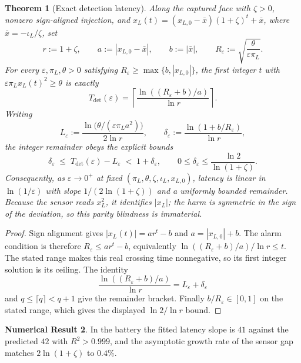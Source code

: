 \documentclass[11pt]{article}
\newtheorem{theorem}{Theorem}[section]
\theoremstyle{definition}
\newtheorem{numresult}[theorem]{Numerical Result}
\theoremstyle{remark}
\numberwithin{equation}{section}
\begin{document}
\begin{theorem}[Exact detection latency]\label{prop:latency}
Along the captured face with $\zeta>0$, nonzero sign-aligned injection, and
$x_L(t)=(x_{L,0}-\bar x)(1+\zeta)^t+\bar x$, where
$\bar x=-\iota_L/\zeta$, set
\[
r:=1+\zeta,\qquad
a:=|x_{L,0}-\bar x|,\qquad b:=|\bar x|,\qquad
R_\varepsilon:=\sqrt{\frac{\theta}{\varepsilon\pi_L}}.
\]
For every $\varepsilon,\pi_L,\theta>0$ satisfying
$R_\varepsilon\ge\max\{b,|x_{L,0}|\}$, the first integer $t$ with
$\varepsilon\pi_Lx_L(t)^2\ge\theta$ is exactly
\[
T_{\det}(\varepsilon)
=
\left\lceil
\frac{\ln((R_\varepsilon+b)/a)}{\ln r}
\right\rceil.
\]
Writing
\[
L_\varepsilon
:=
\frac{\ln\bigl(\theta/(\varepsilon\pi_La^2)\bigr)}{2\ln r},
\qquad
\delta_\varepsilon
:=
\frac{\ln(1+b/R_\varepsilon)}{\ln r},
\]
the integer remainder obeys the explicit bounds
\[
\delta_\varepsilon
\;\le\;T_{\det}(\varepsilon)-L_\varepsilon
\;<\;1+\delta_\varepsilon,
\qquad
0\le\delta_\varepsilon\le\frac{\ln2}{\ln(1+\zeta)}.
\]
Consequently, as $\varepsilon\to0^+$ at fixed
$(\pi_L,\theta,\zeta,\iota_L,x_{L,0})$, latency is linear in
$\ln(1/\varepsilon)$ with slope $1/(2\ln(1+\zeta))$ and a uniformly bounded
remainder. Because the sensor reads $x_L^2$, it identifies $|x_L|$; the harm
is symmetric in the sign of the deviation, so this parity blindness is
immaterial.
\end{theorem}
\begin{proof}
Sign alignment gives
$|x_L(t)|=ar^t-b$ and $a=|x_{L,0}|+b$. The alarm condition is therefore
$R_\varepsilon\le ar^t-b$, equivalently
$\ln((R_\varepsilon+b)/a)/\ln r\le t$. The stated range makes this real
crossing time nonnegative, so its first integer solution is its ceiling. The
identity
\[
\frac{\ln((R_\varepsilon+b)/a)}{\ln r}
=L_\varepsilon+\delta_\varepsilon
\]
and $q\le\lceil q\rceil<q+1$ give the remainder bracket. Finally
$b/R_\varepsilon\in[0,1]$ on the stated range, which gives the displayed
$\ln2/\ln r$ bound.
\end{proof}

\begin{numresult}\label{nr:latency}
In the battery the fitted latency slope is $41$ against the predicted $42$ with $R^2>0.999$, and the asymptotic growth rate of the sensor gap matches $2\ln(1+\zeta)$ to $0.4\%$.
\end{numresult}
\end{document}
